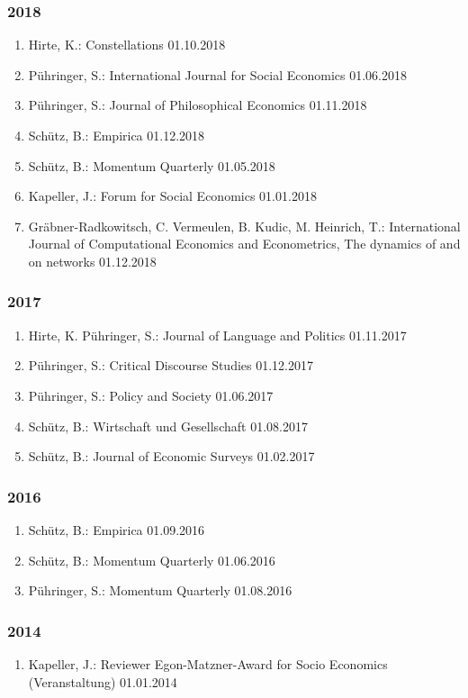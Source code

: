 \subsubsection*{2018}
\begin{enumerate}
	\item Hirte, K.: Constellations 01.10.2018
	\item Pühringer, S.: International Journal for Social Economics 01.06.2018
	\item Pühringer, S.: Journal of Philosophical Economics 01.11.2018
	\item Schütz, B.: Empirica 01.12.2018
	\item Schütz, B.: Momentum Quarterly 01.05.2018
	\item Kapeller, J.: Forum for Social Economics 01.01.2018
	\item Gräbner-Radkowitsch, C. Vermeulen, B. Kudic, M. Heinrich, T.: International Journal of Computational Economics and Econometrics, The dynamics of and on networks 01.12.2018
\end{enumerate}
\subsubsection*{2017}
\begin{enumerate}
	\item Hirte, K. Pühringer, S.: Journal of Language and Politics 01.11.2017
	\item Pühringer, S.: Critical Discourse Studies 01.12.2017
	\item Pühringer, S.: Policy and Society 01.06.2017
	\item Schütz, B.: Wirtschaft und Gesellschaft 01.08.2017
	\item Schütz, B.: Journal of Economic Surveys 01.02.2017
\end{enumerate}
\subsubsection*{2016}
\begin{enumerate}
	\item Schütz, B.: Empirica 01.09.2016
	\item Schütz, B.: Momentum Quarterly 01.06.2016
	\item Pühringer, S.: Momentum Quarterly 01.08.2016
\end{enumerate}
\subsubsection*{2014}
\begin{enumerate}
	\item Kapeller, J.: Reviewer Egon-Matzner-Award for Socio Economics (Veranstaltung) 01.01.2014
\end{enumerate}
